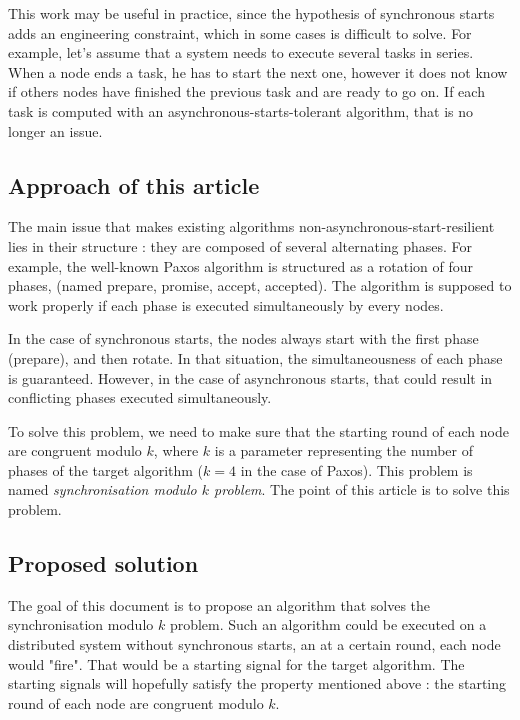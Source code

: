 \documentclass{article}
\begin{document}
This work may be useful in practice, since the hypothesis of synchronous starts adds an engineering constraint, which in some cases is difficult to solve.
For example, let's assume that a system needs to execute several tasks in series.
When a node ends a task, he has to start the next one, however it does not know if others nodes have finished the previous task and are ready to go on.
If each task is computed with an asynchronous-starts-tolerant algorithm, that is no longer an issue.

\subsection{Approach of this article}

The main issue that makes existing algorithms non-asynchronous-start-resilient lies in their structure :
they are composed of several alternating phases.
For example, the well-known Paxos algorithm is structured as a rotation of four phases, (named prepare,
promise, accept, accepted).
The algorithm is supposed to work properly if each phase is executed simultaneously by every nodes.

In the case of synchronous starts, the nodes always start with the first phase (prepare), and then rotate.
In that situation, the simultaneousness of each phase is guaranteed.
However, in the case of asynchronous starts, that could result in conflicting phases executed simultaneously.

To solve this problem, we need to make sure that the starting round of each node are congruent modulo $k$,
where $k$ is a parameter representing the number of phases of the target algorithm ($k=4$ in the case of Paxos).
This problem is named \emph{synchronisation modulo $k$ problem}.
The point of this article is to solve this problem.

\subsection{Proposed solution}

The goal of this document is to propose an algorithm that solves the synchronisation modulo $k$ problem.
Such an algorithm could be executed on a distributed system without synchronous starts,
an at a certain round, each node would "fire".
That would be a starting signal for the target algorithm.
The starting signals will hopefully satisfy the property mentioned above :
the starting round of each node are congruent modulo $k$.
\end{document}
